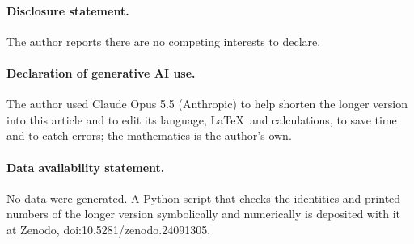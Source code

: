 \documentclass[11pt,a4paper]{article}
\theoremstyle{plain}
\theoremstyle{definition}
\begin{document}
\paragraph{Disclosure statement.} The author reports there are no competing interests to declare.

\paragraph{Declaration of generative AI use.} The author used Claude Opus 5.5 (Anthropic) to help shorten the longer version \cite{DerrazGN} into this article and to edit its language, \LaTeX\ and calculations, to save time and to catch errors; the mathematics is the author's own.

\paragraph{Data availability statement.} No data were generated. A Python script that checks the identities and printed numbers of the longer version symbolically and numerically is deposited with it at Zenodo, doi:10.5281/zenodo.24091305.
\end{document}
